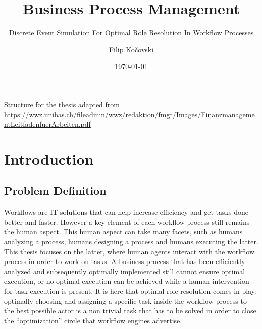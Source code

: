 \documentclass{seal_thesis}
\date{\today}
\title{Business Process Management}
\subtitle{Discrete Event Simulation For Optimal Role Resolution In Workflow Processes}
\author{Filip Ko\v{c}ovski}
\begin{document}
\maketitle

\frontmatter

\begin{acknowledgements}

\end{acknowledgements}

\begin{abstract}
	
\end{abstract}

\begin{zusammenfassung}

\end{zusammenfassung}

\tableofcontents
\listoffigures
\listoftables
\lstlistoflistings

\pagebreak

\mainmatter

Structure for the thesis adapted from \url{https://wwz.unibas.ch/fileadmin/wwz/redaktion/fmgt/Images/FinanzmanagementLeitfadenfuerArbeiten.pdf}

\chapter{Introduction}
\label{ch:intro}

\section{Problem Definition}

Workflows are IT solutions that can help increase efficiency and get tasks done better and faster. However a key element of each workflow process still remains the human aspect. This human aspect can take many facets, such as humans analyzing a process, humans designing a process and humans executing the latter. This thesis focuses on the latter, \ie where human agents interact with the workflow process in order to work on tasks. A business process that has been efficiently analyzed and subsequently optimally implemented still cannot ensure optimal execution, or no optimal execution can be achieved while a human intervention for task execution is present. It is here that optimal role resolution comes in play: optimally choosing and assigning a specific task inside the workflow process to the best possible actor is a non trivial task that has to be solved in order to close the ``optimization'' circle that workflow engines advertise.
\end{document}

